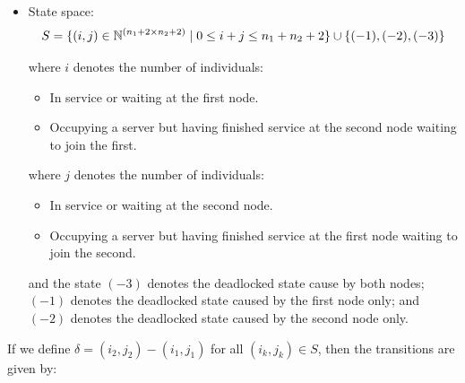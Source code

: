 \documentclass{article}
\begin{document}
\begin{itemize}
    \item State space:
        \[S = \{(i,j)\in\mathbb{N}^{(n_1+2\times n_2+2)} \nonscript\; | \nonscript\; 0 \leq i + j \leq n_1 + n_2 + 2
        \}\cup\{(-1), (-2), (-3)\}\]

        where \(i\) denotes the number of individuals:
            \begin{itemize}
                \item In service or waiting at the first node.
                \item Occupying a server but having finished service at the
                    second node waiting to join the first.
            \end{itemize}
        where \(j\) denotes the number of individuals:
            \begin{itemize}
                \item In service or waiting at the second node.
                \item Occupying a server but having finished service at the
                    first node waiting to join the second.
            \end{itemize}
        and the state $(-3)$ denotes the deadlocked state cause by both nodes; $(-1)$ denotes the deadlocked state caused by the first node only; and $(-2)$ denotes the deadlocked state caused by the second node only.
\end{itemize}

If we define $\delta = (i_2, j_2) - (i_1, j_1)$ for all $(i_k, j_k) \in S$, then the transitions are given by:
\end{document}
